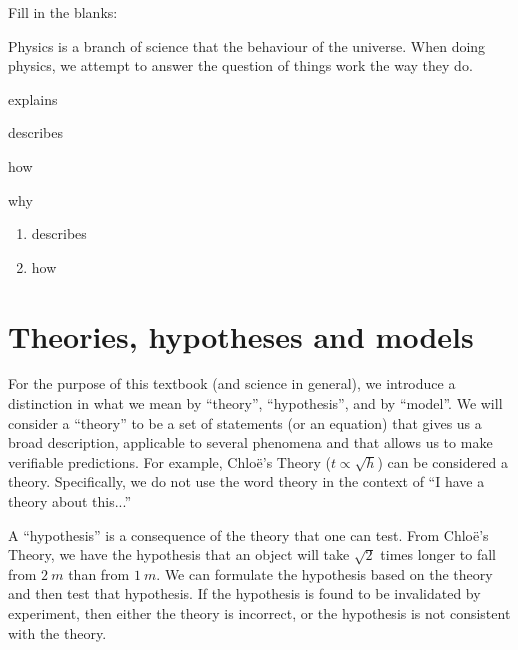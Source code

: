 \begin{checkpoint}
\begin{MCquestion}{Fill in the blanks:

Physics is a branch of science that \underline{\hspace{2cm}} the behaviour of the universe. When doing physics, we attempt to answer the question of \underline{\hspace{2cm}} things work the way they do.}
\item explains
\item describes 
\item how 
\item why
\end{MCquestion}
\begin{answer}
\begin{enumerate}
\item describes
\item how
\end{enumerate}
\end{answer}
\end{checkpoint}

\section{Theories, hypotheses and models}
For the purpose of this textbook (and science in general), we introduce a distinction in what we mean by ``theory'', ``hypothesis'', and by ``model''. We will consider a ``theory'' to be a set of statements (or an equation) that gives us a broad description, applicable to several phenomena and that allows us to make verifiable predictions. For example, Chlo\"e's Theory ($t \propto \sqrt{h}$) can be considered a theory. Specifically, we do not use the word theory in the context of ``I have a theory about this...''

A ``hypothesis'' is a consequence of the theory that one can test. From Chlo\"e's Theory, we have the hypothesis that an object will take $\sqrt{2}$ times longer to fall from $\SI{2}{m}$ than from $\SI{1}{m}$. We can formulate the hypothesis based on the theory and then test that hypothesis. If the hypothesis is found to be invalidated by experiment, then either the theory is incorrect, or the hypothesis is not consistent with the theory.

